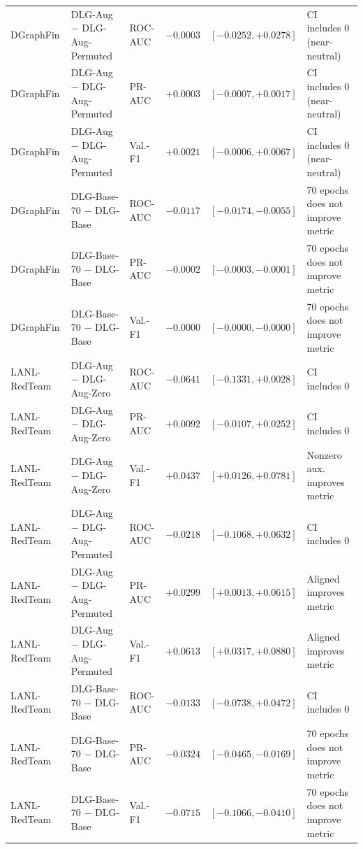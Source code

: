 \begin{table}[t]
\begin{tabular}{@{}l l l r c l@{}}
DGraphFin & DLG-Aug $-$ DLG-Aug-Permuted & ROC-AUC & $-0.0003$ & $[-0.0252, +0.0278]$ & CI includes 0 (near-neutral) \\
DGraphFin & DLG-Aug $-$ DLG-Aug-Permuted & PR-AUC & $+0.0003$ & $[-0.0007, +0.0017]$ & CI includes 0 (near-neutral) \\
DGraphFin & DLG-Aug $-$ DLG-Aug-Permuted & Val.-F1 & $+0.0021$ & $[-0.0006, +0.0067]$ & CI includes 0 (near-neutral) \\
DGraphFin & DLG-Base-70 $-$ DLG-Base & ROC-AUC & $-0.0117$ & $[-0.0174, -0.0055]$ & 70 epochs does not improve metric \\
DGraphFin & DLG-Base-70 $-$ DLG-Base & PR-AUC & $-0.0002$ & $[-0.0003, -0.0001]$ & 70 epochs does not improve metric \\
DGraphFin & DLG-Base-70 $-$ DLG-Base & Val.-F1 & $-0.0000$ & $[-0.0000, -0.0000]$ & 70 epochs does not improve metric \\
\midrule
LANL-RedTeam & DLG-Aug $-$ DLG-Aug-Zero & ROC-AUC & $-0.0641$ & $[-0.1331, +0.0028]$ & CI includes 0 \\
LANL-RedTeam & DLG-Aug $-$ DLG-Aug-Zero & PR-AUC & $+0.0092$ & $[-0.0107, +0.0252]$ & CI includes 0 \\
LANL-RedTeam & DLG-Aug $-$ DLG-Aug-Zero & Val.-F1 & $+0.0437$ & $[+0.0126, +0.0781]$ & Nonzero aux. improves metric \\
LANL-RedTeam & DLG-Aug $-$ DLG-Aug-Permuted & ROC-AUC & $-0.0218$ & $[-0.1068, +0.0632]$ & CI includes 0 \\
LANL-RedTeam & DLG-Aug $-$ DLG-Aug-Permuted & PR-AUC & $+0.0299$ & $[+0.0013, +0.0615]$ & Aligned improves metric \\
LANL-RedTeam & DLG-Aug $-$ DLG-Aug-Permuted & Val.-F1 & $+0.0613$ & $[+0.0317, +0.0880]$ & Aligned improves metric \\
LANL-RedTeam & DLG-Base-70 $-$ DLG-Base & ROC-AUC & $-0.0133$ & $[-0.0738, +0.0472]$ & CI includes 0 \\
LANL-RedTeam & DLG-Base-70 $-$ DLG-Base & PR-AUC & $-0.0324$ & $[-0.0465, -0.0169]$ & 70 epochs does not improve metric \\
LANL-RedTeam & DLG-Base-70 $-$ DLG-Base & Val.-F1 & $-0.0715$ & $[-0.1066, -0.0410]$ & 70 epochs does not improve metric \\
\bottomrule
\end{tabular}
\end{table}
